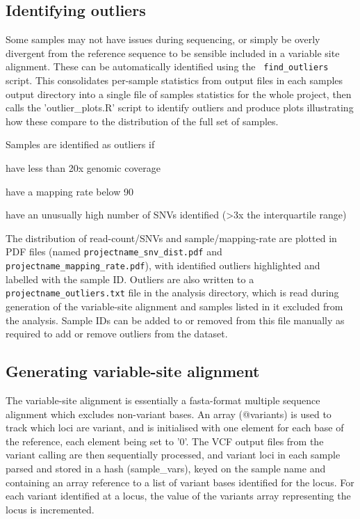 \documentclass[a4paper,10pt,twoside]{article}
\newenvironment{tight_itemize}{
\begin{itemize}
  \setlength{\itemsep}{0pt}
  \setlength{\parskip}{0pt}
}{\end{itemize}}
\begin{document}
\subsection{Identifying outliers}

Some samples may not have issues during sequencing, or simply be overly
divergent from the reference sequence to be sensible included in a variable
site alignment. These can be automatically identified using the {\tt
find\_outliers} script. This consolidates per-sample statistics from output
files in each samples output directory into a single file of samples statistics
for the whole project, then calls the 'outlier\_plots.R' script to identify
outliers and produce plots illustrating how these compare to the distribution
of the full set of samples.

Samples are identified as outliers if
\begin{tight_itemize}
\item have less than 20x genomic coverage
\item have a mapping rate below 90%
\item have an unusually high number of SNVs identified (>3x the interquartile range)
\end{tight_itemize}

The distribution of read-count/SNVs and sample/mapping-rate are plotted in PDF
files (named {\tt projectname\_snv\_dist.pdf} and
{\tt projectname\_mapping\_rate.pdf}), with identified outliers highlighted and
labelled with the sample ID. Outliers are also written to a {\tt
projectname\_outliers.txt} file in the analysis directory, which is read during
generation of the variable-site alignment and samples listed in it excluded
from the analysis. Sample IDs can be added to or removed from this file
manually as required to add or remove outliers from the dataset. 

\subsection{Generating variable-site alignment}

The variable-site alignment is essentially a fasta-format multiple sequence
alignment which excludes non-variant bases.  An array (@variants) is used to
track which loci are variant, and is initialised with one element for each base
of the reference, each element being set to '0'. The VCF output files from the
variant calling are then sequentially processed, and variant loci in each
sample parsed and stored in a hash (sample\_vars), keyed on the sample name and
containing an array reference to a list of variant bases identified for the
locus. For each variant identified at a locus, the value of the variants array
representing the locus is incremented. 
\end{document}
